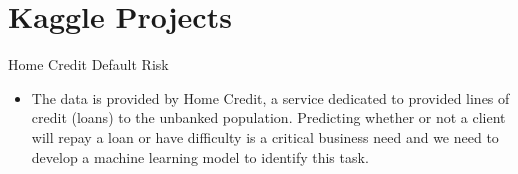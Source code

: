 \documentclass[letterpaper]{twentysecondcv} %
\begin{document}
\section{Kaggle Projects}
\begin{twenty} %
\twentyitem
    	{}
		{}
        {Home Credit Default Risk}
        {\href{}{}}
        {}
        {\begin{itemize}
        \item The data is provided by Home Credit, a service dedicated to provided lines of credit (loans) to the unbanked population. Predicting whether or not a client will repay a loan or have difficulty is a critical business need and we need to develop a machine learning model to identify this task.
        \end{itemize}}
        \\
\end{twenty}

\end{document}
